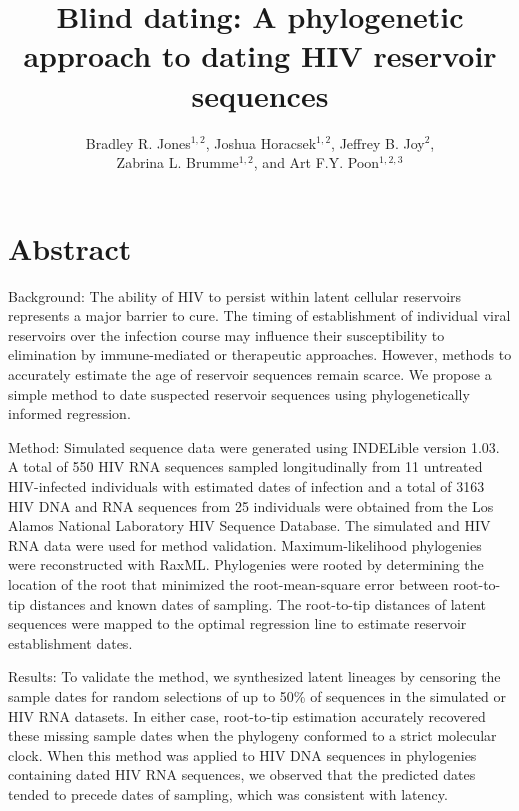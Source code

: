 \documentclass[12pt]{article}
\begin{document}
\title{Blind dating: A phylogenetic approach to dating HIV reservoir sequences}

\author{Bradley R. Jones$^{1,2}$, Joshua Horacsek$^{1,2}$, Jeffrey B. Joy$^2$, \\ Zabrina L. Brumme$^{1,2}$, and Art F.Y. Poon$^{1,2,3}$}
\baselineskip 22pt
\pagewiselinenumbers

\date{}
\maketitle

\section * {Abstract}

Background: 
The ability of HIV to persist within latent cellular reservoirs represents a major barrier to cure. The timing of establishment of individual viral reservoirs over the infection course may influence their susceptibility to elimination by immune-mediated or therapeutic approaches. However, methods to accurately estimate the age of reservoir sequences remain scarce. We propose a simple method to date suspected reservoir sequences using phylogenetically informed regression.

Method: 
Simulated sequence data were generated using INDELible version 1.03. A total of 550 HIV RNA sequences sampled longitudinally from 11 untreated HIV-infected individuals with estimated dates of infection and a total of 3163 HIV DNA and RNA sequences from 25 individuals were obtained from the Los Alamos National Laboratory HIV Sequence Database. The simulated and HIV RNA data were used for method validation. Maximum-likelihood phylogenies were reconstructed with RaxML. Phylogenies were rooted by determining the location of the root that minimized the root-mean-square error between root-to-tip distances and known dates of sampling. The root-to-tip distances of latent sequences were mapped to the optimal regression line to estimate reservoir establishment dates.

Results: 
To validate the method, we synthesized latent lineages by censoring the sample dates for random selections of up to 50\% of sequences in the simulated or HIV RNA datasets. In either case, root-to-tip estimation accurately recovered these missing sample dates when the phylogeny conformed to a strict molecular clock. When this method was applied to HIV DNA sequences in phylogenies containing dated HIV RNA sequences, we observed that the predicted dates tended to precede dates of sampling, which was consistent with latency.
\end{document}
